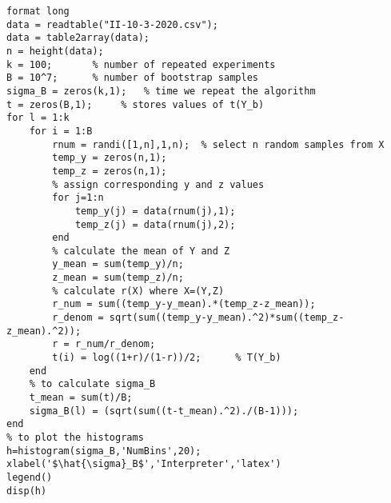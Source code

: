 \lstset{basicstyle=\footnotesize,style=myCustomMatlabStyle}
\begin{lstlisting}
format long
data = readtable("II-10-3-2020.csv");
data = table2array(data);
n = height(data);
k = 100;       % number of repeated experiments
B = 10^7;      % number of bootstrap samples
sigma_B = zeros(k,1);   % time we repeat the algorithm
t = zeros(B,1);     % stores values of t(Y_b)
for l = 1:k
    for i = 1:B
        rnum = randi([1,n],1,n);  % select n random samples from X
        temp_y = zeros(n,1);  
        temp_z = zeros(n,1);
        % assign corresponding y and z values
        for j=1:n
            temp_y(j) = data(rnum(j),1);
            temp_z(j) = data(rnum(j),2);
        end
        % calculate the mean of Y and Z
        y_mean = sum(temp_y)/n;
        z_mean = sum(temp_z)/n;
        % calculate r(X) where X=(Y,Z)
        r_num = sum((temp_y-y_mean).*(temp_z-z_mean));
        r_denom = sqrt(sum((temp_y-y_mean).^2)*sum((temp_z-z_mean).^2));
        r = r_num/r_denom;
        t(i) = log((1+r)/(1-r))/2;      % T(Y_b)
    end
    % to calculate sigma_B
    t_mean = sum(t)/B;
    sigma_B(l) = (sqrt(sum((t-t_mean).^2)./(B-1)));
end
% to plot the histograms
h=histogram(sigma_B,'NumBins',20);
xlabel('$\hat{\sigma}_B$','Interpreter','latex')
legend()
disp(h)

\end{lstlisting}